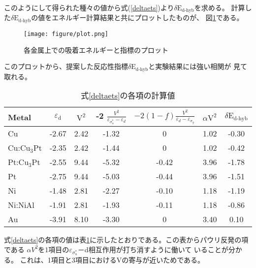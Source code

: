 \documentclass[12pt]{ltjsarticle}
\begin{document}
このようにして得られた種々の値から式(\ref{deltaets})より$\delta \text{E}_\text{d-hyb}$を求める。
計算した$\delta \text{E}_\text{d-hyb}$の値をエネルギー計算結果と共にプロットしたものが、
図\ref{fig:plot}である。
\begin{figure}[hbtp]
    \begin{center}
     \texttt{[image: figure/plot.png]}
    \end{center}
    \caption{各金属上での吸着エネルギーと指標のプロット}
    \label{fig:plot}
\end{figure}
このプロットから、提案した反応性指標$\delta \text{E}_\text{d-hyb}$と実験結果には強い相関が
見て取れる。
\begin{table}[htb]
  \begin{center}
    \caption{式\ref{deltaets}の各項の計算値}
    \begin{tabular}{l|cccccc} \hline
    \label{table}
      Metal & $\varepsilon_\text{d}$ & $\text{V}^\text{2}$ & -2 $\frac{ V^2 }{\varepsilon _{\sigma_u^*}- \varepsilon _d}$ & $-2(1-f)\frac{V^2}{\varepsilon _d - \varepsilon _{\sigma_g}} $ & $\alpha \text{V}^\text{2}$ & $\delta \text{E}_\text{d-hyb}$ \\ \hline
      Cu                        & -2.67 & 2.42 & -1.32 & 0     & 1.02 & -0.30 \\
      Cu:$\text{Cu}_\text{3}$Pt & -2.35 & 2.42 & -1.44 & 0     & 1.02 & -0.42 \\
      Pt:$\text{Cu}_\text{3}$Pt & -2.55 & 9.44 & -5.32 & -0.42 & 3.96 & -1.78 \\
      Pt                        & -2.75 & 9.44 & -5.03 & -0.44 & 3.96 & -1.51 \\
      Ni                        & -1.48 & 2.81 & -2.27 & -0.10 & 1.18 & -1.19 \\ 
      Ni:NiAl                   & -1.91 & 2.81 & -1.93 & -0.11 & 1.18 & -0.86 \\
      Au                        & -3.91 & 8.10 & -3.30 & 0     & 3.40 & 0.10  \\ \hline
    \end{tabular}
  \end{center}
\end{table}

式\ref{deltaets}の各項の値は表\ref{table}に示したとおりである。この表からパウリ反発の項である
$\alpha V^2$を1項目の$\varepsilon _{\sigma_u^*}$－d相互作用が打ち消すように働いて
いることが分かる。
これは、1項目と3項目におけるVの寄与が近いためである。
\end{document}
